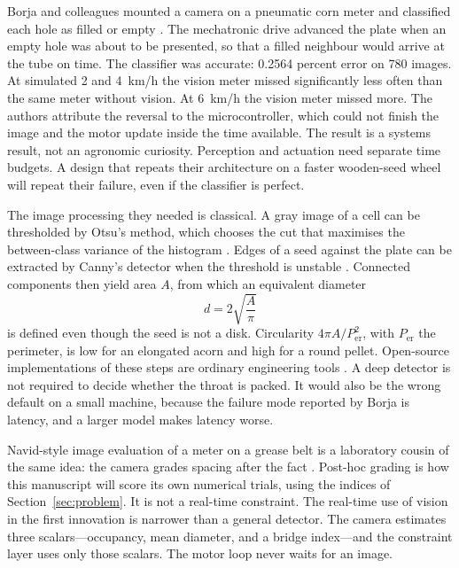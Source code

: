 Borja and colleagues mounted a camera on a pneumatic corn meter and classified each hole as filled or empty \cite{borja2021}. The mechatronic drive advanced the plate when an empty hole was about to be presented, so that a filled neighbour would arrive at the tube on time. The classifier was accurate: 0.2564 percent error on 780 images. At simulated 2 and 4~km/h the vision meter missed significantly less often than the same meter without vision. At 6~km/h the vision meter missed more. The authors attribute the reversal to the microcontroller, which could not finish the image and the motor update inside the time available. The result is a systems result, not an agronomic curiosity. Perception and actuation need separate time budgets. A design that repeats their architecture on a faster wooden-seed wheel will repeat their failure, even if the classifier is perfect.

The image processing they needed is classical. A gray image of a cell can be thresholded by Otsu's method, which chooses the cut that maximises the between-class variance of the histogram \cite{otsu1979,gonzalez2018}. Edges of a seed against the plate can be extracted by Canny's detector when the threshold is unstable \cite{canny1986}. Connected components then yield area $A$, from which an equivalent diameter
\begin{equation}
d = 2\sqrt{\frac{A}{\pi}}
\label{eq:deq}
\end{equation}
is defined even though the seed is not a disk. Circularity $4\pi A/P_{\mathrm{er}}^2$, with $P_{\mathrm{er}}$ the perimeter, is low for an elongated acorn and high for a round pellet. Open-source implementations of these steps are ordinary engineering tools \cite{bradski2000}. A deep detector is not required to decide whether the throat is packed. It would also be the wrong default on a small machine, because the failure mode reported by Borja is latency, and a larger model makes latency worse.

Navid-style image evaluation of a meter on a grease belt is a laboratory cousin of the same idea: the camera grades spacing after the fact \cite{panning2000}. Post-hoc grading is how this manuscript will score its own numerical trials, using the indices of Section~\ref{sec:problem}. It is not a real-time constraint. The real-time use of vision in the first innovation is narrower than a general detector. The camera estimates three scalars---occupancy, mean diameter, and a bridge index---and the constraint layer uses only those scalars. The motor loop never waits for an image.

